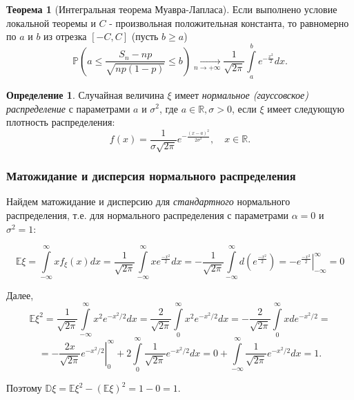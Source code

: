 \documentclass[oneside,final,14pt]{extreport}
\theoremstyle{plain}
\theoremstyle{definition}
\newtheorem*{defn}{Определение}
\theoremstyle{named}
\newtheorem*{namedthm}{Теорема}
\begin{document}
\begin{namedthm}[Интегральная теорема Муавра-Лапласа]
Если выполнено условие локальной теоремы и $C$ - произвольная положительная константа, то равномерно по $a$ и $b$ из отрезка $[-C,C]$ (пусть $b \geqslant a$)
$$\mathbb{P}\left(a \leqslant \frac{S_{n}-n p}{\sqrt{n p(1-p)}} \leqslant b\right) \underset{n \to +\infty}{\longrightarrow} \frac{1}{\sqrt{2 \pi}} \int\limits_{a}^{b} e^{-\frac{x^{2}}{2}} d x.$$
\end{namedthm} 

\begin{defn}
    Случайная величина $\xi$ имеет {\it нормальное (гауссовское) распределение} с параметрами $a$ и $\sigma^2$, где $a \in \mathbb{R}, \sigma > 0$, если $\xi$ имеет следующую плотность распределения: 
$$f(x)=\frac{1}{\sigma \sqrt{2 \pi}} e^{-\frac{(x-a)^{2}}{2 \sigma^{2}}}, \quad x \in \mathbb{R}.$$
\end{defn}

\subsubsection{Матожидание и дисперсия нормального распределения}

Найдем матожидание и дисперсию для {\it стандартного} нормального распределения, т.е. для нормального распределения с параметрами $\alpha = 0$ и $\sigma^2 = 1$:


$$\mathbb{E}\xi = 
\int\limits_{-\infty}^{\infty} x f_{\xi}(x) dx =
\frac{1}{\sqrt{2\pi}} \int\limits_{-\infty}^{\infty} x e^{\frac{-x^2}{2}} dx = 
-\frac{1}{\sqrt{2\pi}} \int\limits_{-\infty}^{\infty} d\left( e^{\frac{-x^2}{2}}\right) = 
\left. -e^{\frac{-x^2}{2}}\right|_{-\infty}^{\infty} = 0$$

Далее, 
$$\mathbb{E} \xi^{2}=\frac{1}{\sqrt{2 \pi}} \int\limits_{-\infty}^{\infty} x^{2} e^{-x^{2} / 2} d x=\frac{2}{\sqrt{2 \pi}} \int\limits_{0}^{\infty} x^{2} e^{-x^{2} / 2} d x=-\frac{2}{\sqrt{2 \pi}} \int\limits_{0}^{\infty} x d e^{-x^{2} / 2}=$$ $$=-\left.\frac{2 x}{\sqrt{2 \pi}} e^{-x^{2} / 2}\right|_{0} ^{\infty}+2 \int\limits_{0}^{\infty} \frac{1}{\sqrt{2 \pi}} e^{-x^{2} / 2} d x=0+\int\limits_{-\infty}^{\infty} \frac{1}{\sqrt{2 \pi}} e^{-x^{2} / 2} d x=1.$$

Поэтому $\mathbb{D}\xi = \mathbb{E}\xi^2 - (\mathbb{E}\xi)^2 = 1 - 0 = 1.$
\end{document}

